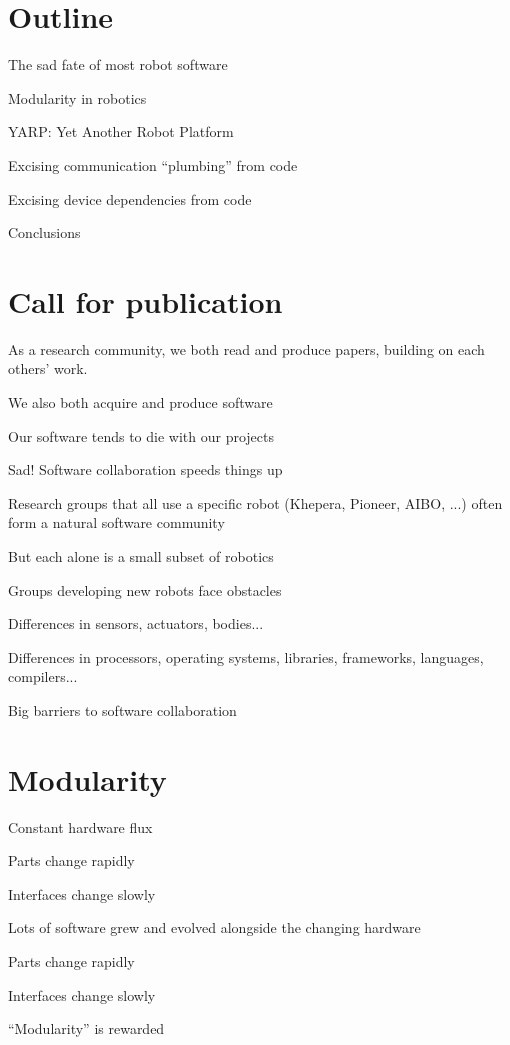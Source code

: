 
\section{Outline}

The sad fate of most robot software

Modularity in robotics

YARP: Yet Another Robot Platform

Excising communication ``plumbing'' from code

Excising device dependencies from code

Conclusions


\section{Call for publication}

As a research community, we both read and produce papers, building on
each others' work.

We also both acquire and produce software

Our software tends to die with our projects

Sad!  Software collaboration speeds things up

Research groups that all use a specific robot (Khepera, Pioneer, AIBO,
...) often form a natural software community

But each alone is a small subset of robotics

Groups developing new robots face obstacles

Differences in sensors, actuators, bodies...

Differences in processors, operating systems, libraries, frameworks,
languages, compilers...

Big barriers to software collaboration


\section{Modularity}

Constant hardware flux

Parts change rapidly

Interfaces change slowly

Lots of software grew and evolved alongside the changing hardware

Parts change rapidly

Interfaces change slowly

``Modularity'' is rewarded


